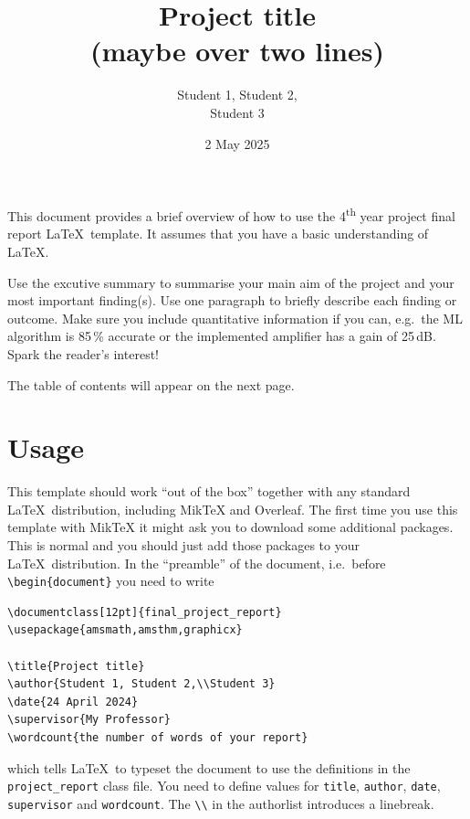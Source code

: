 \documentclass[12pt]{final_project_report}
\title{Project title\\(maybe over two lines)}
\author{Student 1, Student 2,\\Student 3}
\date{2 May 2025}
\begin{document}
\coverpage
\declaration
\maketitle
\begin{exec_summary}
This document provides a brief overview of how to use the 4\textsuperscript{th} year project final report \LaTeX\ template. It assumes that you have a basic understanding of \LaTeX.

Use the excutive summary to summarise your main aim of the project and your most important finding(s). Use one paragraph to briefly describe each finding or outcome. Make sure you include quantitative information if you can, e.g.\ the ML algorithm is 85\,\% accurate or the implemented amplifier has a gain of 25\,dB. Spark the reader’s interest!

The table of contents will appear on the next page.
\end{exec_summary}

\tableofcontents
\section{Usage}
This template should work ``out of the box'' together with any standard \LaTeX\ distribution, including MikTeX and Overleaf. The first time you use this template with MikTeX it might ask you to download some additional packages. This is normal and you should just add those packages to your \LaTeX\ distribution. In the ``preamble'' of the document, i.e.\ before \verb!\begin{document}! you need to write
\begin{verbatim}
\documentclass[12pt]{final_project_report}
\usepackage{amsmath,amsthm,graphicx}

\title{Project title}
\author{Student 1, Student 2,\\Student 3}
\date{24 April 2024}
\supervisor{My Professor}
\wordcount{the number of words of your report}
\end{verbatim}
which tells \LaTeX\ to typeset the document to use the definitions in the \verb!project_report! class file. You need to define values for \verb!title!, \verb!author!, \verb!date!, \verb!supervisor! and \verb!wordcount!. The \verb!\\! in the authorlist introduces a linebreak.
\end{document}

